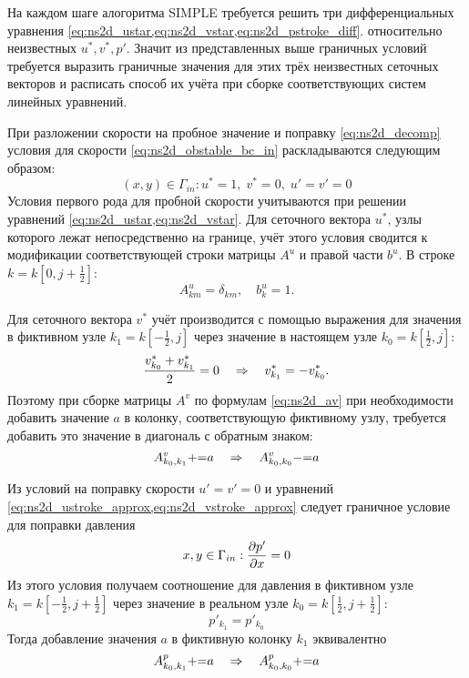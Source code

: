 На каждом шаге алогоритма SIMPLE требуется
решить три дифференциальных уравнения \cref{eq:ns2d_ustar,eq:ns2d_vstar,eq:ns2d_pstroke_diff}.
относительно неизвестных $u^*, v^*, p'$.
Значит из представленных выше граничных условий требуется
выразить граничные значения для этих трёх неизвестных сеточных векторов
и расписать способ их учёта при сборке соответствующих систем линейных уравнений.

\label{sec:obstacle_bc_input}
При разложении скорости на пробное значение и поправку \cref{eq:ns2d_decomp}
условия для скорости \cref{eq:ns2d_obstable_bc_in} раскладываются следующим образом:
\begin{equation}
\label{eq:ns2d_decomp_input}
(x,y) \in \Gamma_{in}: u^* = 1, \; v^* = 0, \; u' = v' = 0
\end{equation}
Условия первого рода для пробной скорости учитываются при решении уравнений
\cref{eq:ns2d_ustar,eq:ns2d_vstar}.
Для сеточного вектора $u^*$, узлы которого лежат непосредственно на границе,
учёт этого условия сводится к модификации соответствующей строки матрицы $A^u$ и правой части $b^u$.
В строке $k=k\left[0, j+\tfrac12\right]$:
\begin{equation}
\label{eq:ns2d_au_bc_left}
A^u_{km} = \delta_{km}, \quad b^u_k = 1.
\end{equation}

Для сеточного вектора $v^*$ учёт производится с помощью выражения для значения в фиктивном узле $k_1 = k\left[-\tfrac12, j\right]$
через значение в настоящем узле $k_0 = k\left[\tfrac12, j\right]$:
$$
\frac{v^*_{k_0} + v^*_{k_1}}{2} = 0 \quad\Rightarrow\quad v^*_{k_1} = -v^*_{k_0}.
$$
Поэтому при сборке матрицы $A^v$ по формулам \cref{eq:ns2d_av} при необходимости добавить
значение $a$ в колонку, соответствующую фиктивному узлу, требуется добавить это значение
в диагональ с обратным знаком:
\begin{equation}
\label{eq:ns2d_av_bc_left}
A^v_{k_0, k_1} {{+}{=}} a \quad\Rightarrow\quad A^v_{k_0, k_0} {{-}{=}} a
\end{equation}

Из условий на поправку скорости $u'=v'=0$ и уравнений \cref{eq:ns2d_ustroke_approx,eq:ns2d_vstroke_approx}
следует граничное условие для поправки давления
\begin{equation}
\label{eq:ns2d_obstacle_bc_pres}
x,y\in\Gamma_{in}: \frac{\partial p'}{\partial x}=0
\end{equation}
Из этого условия получаем соотношение для давления в фиктивном узле $k_1 = k\left[-\tfrac12, j+\tfrac12\right]$
через значение  в реальном узле $k_0 = k\left[\tfrac12, j+\tfrac12\right]$:
$$
p'_{k_1} = p'_{k_0}
$$
Тогда добавление значения $a$ в фиктивную колонку $k_1$ эквивалентно
\begin{equation}
\label{eq:ns2d_ap_bc}
A^p_{k_0, k_1} {{+}{=}} a \quad\Rightarrow\quad A^p_{k_0, k_0} {{+}{=}} a
\end{equation}

